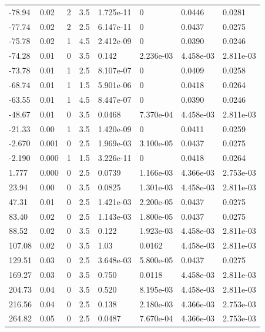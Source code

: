 \documentclass[preview]{standalone}
\begin{document}
{{\begin{tabular}{L{1.2cm}C{1.2cm} C{0.3cm}C{0.5cm} C{1.4cm}C{1.4cm} C{1.4cm}C{1.4cm}}
  -78.94  &  0.02  & 2     & 3.5 &  1.725e-11  & 0  & 0.0446 &  0.0281   \\ 
  -77.74  &  0.02  & 2     & 2.5 &  6.147e-11  & 0  & 0.0437 &  0.0275   \\ 
  -75.78  &  0.02  & 1     & 4.5 &  2.412e-09  & 0  & 0.0390 &  0.0246   \\ 
  -74.28  &  0.01  & 0     & 3.5 &  0.142  & 2.236e-03  & 4.458e-03 &  2.811e-03   \\ 
  -73.78  &  0.01  & 1     & 2.5 &  8.107e-07  & 0  & 0.0409 &  0.0258   \\ 
  -68.74  &  0.01  & 1     & 1.5 &  5.901e-06  & 0  & 0.0418 &  0.0264   \\ 
  -63.55  &  0.01  & 1     & 4.5 &  8.447e-07  & 0  & 0.0390 &  0.0246   \\ 
  -48.67  &  0.01  & 0     & 3.5 &  0.0468  & 7.370e-04  & 4.458e-03 &  2.811e-03   \\ 
  -21.33  &  0.00  & 1     & 3.5 &  1.420e-09  & 0  & 0.0411 &  0.0259   \\ 
  -2.670  &  0.001  & 0     & 2.5 &  1.969e-03  & 3.100e-05  & 0.0437 &  0.0275   \\ 
  -2.190  &  0.000  & 1     & 1.5 &  3.226e-11  & 0  & 0.0418 &  0.0264   \\ 
  1.777  &  0.000  & 0     & 2.5 &  0.0739  & 1.166e-03  & 4.366e-03 &  2.753e-03   \\ 
  23.94  &  0.00  & 0     & 3.5 &  0.0825  & 1.301e-03  & 4.458e-03 &  2.811e-03   \\ 
  47.31  &  0.01  & 0     & 2.5 &  1.421e-03  & 2.200e-05  & 0.0437 &  0.0275   \\ 
  83.40  &  0.02  & 0     & 2.5 &  1.143e-03  & 1.800e-05  & 0.0437 &  0.0275   \\ 
  88.52  &  0.02  & 0     & 3.5 &  0.122  & 1.923e-03  & 4.458e-03 &  2.811e-03   \\ 
  107.08  &  0.02  & 0     & 3.5 &  1.03  & 0.0162  & 4.458e-03 &  2.811e-03   \\ 
  129.51  &  0.03  & 0     & 2.5 &  3.648e-03  & 5.800e-05  & 0.0437 &  0.0275   \\ 
  169.27  &  0.03  & 0     & 3.5 &  0.750  & 0.0118  & 4.458e-03 &  2.811e-03   \\ 
  204.73  &  0.04  & 0     & 3.5 &  0.520  & 8.195e-03  & 4.458e-03 &  2.811e-03   \\ 
  216.56  &  0.04  & 0     & 2.5 &  0.138  & 2.180e-03  & 4.366e-03 &  2.753e-03   \\ 
  264.82  &  0.05  & 0     & 2.5 &  0.0487  & 7.670e-04  & 4.366e-03 &  2.753e-03   \\ 

\end{tabular}}}
\end{document}
